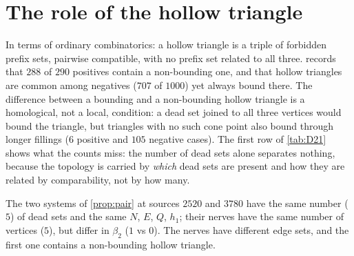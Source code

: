 \section{The role of the hollow triangle}
In terms of ordinary combinatorics: a hollow triangle is a triple of forbidden prefix sets, pairwise compatible, with no prefix set related to all three.  records that $288$ of $290$ positives contain a non-bounding one, and that hollow triangles are common among negatives ($707$ of $1000$) yet always bound there. The difference between a bounding and a non-bounding hollow triangle is a homological, not a local, condition: a dead set joined to all three vertices would bound the triangle, but triangles with no such cone point also bound through longer fillings ($6$ positive and $105$ negative cases). The first row of \cref{tab:D21} shows what the counts miss: the number of dead sets alone separates nothing, because the topology is carried by \emph{which} dead sets are present and how they are related by comparability, not by how many.
\begin{proposition}\label{prop:counts-fail}
The two systems of \cref{prop:pair} at sources $2520$ and $3780$ have the same number ($5$) of dead sets and the same $N$, $E$, $Q$, $h_1$; their nerves have the same number of vertices ($5$), but differ in $\beta_2$ ($1$ vs $0$). The nerves have different edge sets, and the first one contains a non-bounding hollow triangle.
\end{proposition}

